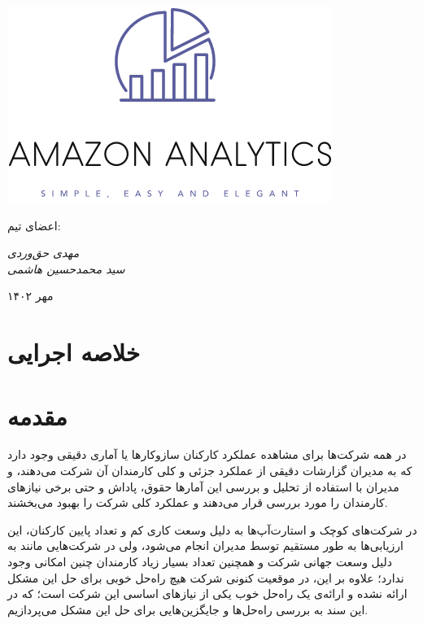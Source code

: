 \documentclass[12pt]{article}
\begin{document}
    \begin{titlepage}
        \centering
        \vspace{1cm}
        {\Huge {}\par}
        \vspace{15mm}
         \includegraphics{../images/alogo} \par
        
        \vfill \par	\vfill
        
        {\small
        اعضای تیم: \par    
            \itshape                مهدی حق‌وردی\\
            سید محمدحسین هاشمی \par}
        \vspace{5cm}
        {\large مهر ۱۴۰۲\par}
    \end{titlepage}
\tableofcontents
\newpage

\section{خلاصه اجرایی}

\section{مقدمه}
در همه شرکت‌ها برای مشاهده عملکرد کارکنان سازوکارها یا آماری دقیقی وجود دارد که به مدیران گزارشات دقیقی از عملکرد جزئی و کلی کارمندان آن شرکت می‌دهند،‌ و مدیران با استفاده از تحلیل و بررسی این آمار‌ها حقوق، پاداش و حتی برخی نیازهای کارمندان را مورد بررسی قرار می‌دهند و عملکرد کلی شرکت را بهبود می‌بخشند. 

در شرکت‌های کوچک و استارت‌آپ‌ها به دلیل وسعت کاری کم و تعداد پایین کارکنان، این ارزیابی‌ها به طور مستقیم توسط مدیران انجام می‌شود، ولی در شرکت‌هایی مانند  به دلیل وسعت جهانی شرکت و همچنین تعداد بسیار زیاد کارمندان چنین امکانی وجود ندارد؛ علاوه بر این، در موقعیت کنونی شرکت  هیچ راه‌حل خوبی برای حل این مشکل ارائه نشده و ارائه‌ی یک راه‌حل خوب یکی از نیاز‌های اساسی این شرکت است؛ که در این سند به بررسی راه‌حل‌ها  و جایگزین‌هایی برای حل این مشکل می‌پردازیم.
\end{document}
